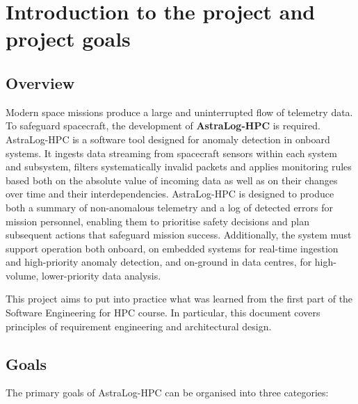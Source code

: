 \documentclass{article}
\begin{document}

\clearpage
\tableofcontents
\clearpage

\section{Introduction to the project and project goals}

\subsection{Overview}

Modern space missions produce a large and uninterrupted flow of telemetry data. To safeguard spacecraft, the development of \textbf{AstraLog-HPC} is required. AstraLog-HPC is a software tool designed for anomaly detection in onboard systems. It ingests data streaming from spacecraft sensors within each system and subsystem, filters systematically invalid packets and applies monitoring rules based both on the absolute value of incoming data as well as on their changes over time and their interdependencies.
AstraLog-HPC is designed to produce both a summary of non-anomalous telemetry and a log of detected errors for mission personnel, enabling them to prioritise safety decisions and plan subsequent actions that safeguard mission success.
Additionally, the system must support operation both onboard, on embedded systems for real-time ingestion and high-priority anomaly detection, and on-ground in data centres, for high-volume, lower-priority data analysis. 

\medskip
This project aims to put into practice what was learned from the first part of the Software Engineering for HPC course. In particular, this document covers principles of requirement engineering and architectural design.  

\subsection{Goals}

The primary goals of AstraLog-HPC can be organised into three categories: 
\end{document}
